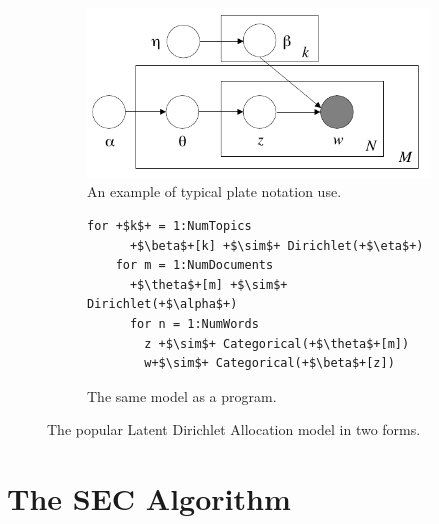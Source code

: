 \documentclass{article} %
\begin{document}


\begin{figure}[h]
\centering
\begin{subfigure}{.5\textwidth}
  \centering
\includegraphics[width=.7\linewidth]{./figures/lda_plate_blei.pdf}
  \caption{An example of typical plate notation use. \label{fig:lda_plate}}

\end{subfigure}%
\begin{subfigure}{.4\textwidth}
	\begin{lstlisting}[frame=single, numbers=none, xleftmargin=0pt]
	for +$k$+ = 1:NumTopics
	  +$\beta$+[k] +$\sim$+ Dirichlet(+$\eta$+)
	for m = 1:NumDocuments
	  +$\theta$+[m] +$\sim$+ Dirichlet(+$\alpha$+) 
	  for n = 1:NumWords 
	    z +$\sim$+ Categorical(+$\theta$+[m])
	    w+$\sim$+ Categorical(+$\beta$+[z])
	\end{lstlisting}
  \caption{The same model as a program.}
  \label{fig:lda_code}
\end{subfigure}
\caption{The popular Latent Dirichlet Allocation model in two forms.}
\label{fig:lda}
\end{figure}


\section{The SEC Algorithm}
\end{document}
